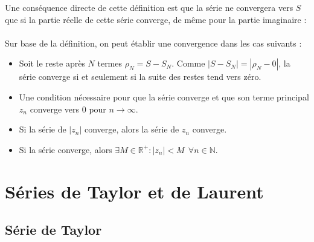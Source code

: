 Une conséquence directe de cette définition est que la série ne convergera vers $S$ que si
la partie réelle de cette série converge, de même pour la partie imaginaire : \\
	
\ \\
	
Sur base de la définition, on peut établir une convergence dans les cas suivants :
\begin{itemize}
	\item Soit le reste après $N$ termes $\rho_N = S-S_N$. Comme $|S-S_N| = |\rho_N - 0|$, la 
	      série converge si et seulement si la suite des restes tend vers zéro.
	\item Une condition nécessaire pour que la série converge et que son terme principal $z_n$
	      converge vers 0 pour $n\rightarrow\infty$.
	\item Si la série de $|z_n|$ converge, alors la série de $z_n$ converge.
	\item Si la série converge, alors $\exists M \in \mathbb{R}^+ : |z_n|<M\ \ \forall n \in 
	      \mathbb{N}$.
\end{itemize}
\section{Séries de Taylor et de Laurent}
\subsection{Série de Taylor}
\ \\
	
